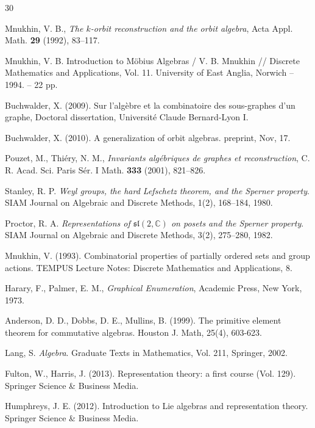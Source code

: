 \documentclass[12pt,reqno]{amsart}
\begin{document}
\begin{thebibliography}{30}

Mnukhin, V. B.,
\emph{The $k$-orbit reconstruction and the orbit algebra},
Acta Appl. Math. \textbf{29} (1992), 83--117.


Mnukhin, V. B. Introduction to M\"obius Algebras / V. B. Mnukhin //
Discrete Mathematics and Applications, Vol. 11. University of East
Anglia, Norwich – 1994. – 22 pp.

Buchwalder, X. (2009). Sur l'alg{\`e}bre et la combinatoire des sous-graphes d'un graphe, Doctoral dissertation, Universit{\'e} Claude Bernard-Lyon I.

Buchwalder, X. (2010). A generalization of orbit algebras. preprint, Nov, 17.

Pouzet, M., Thi\'ery, N. M.,
\emph{Invariants alg\'ebriques de graphes et reconstruction},
C. R. Acad. Sci. Paris S\'er. I Math. \textbf{333} (2001), 821--826.

Stanley, R. P.
\emph{Weyl groups, the hard Lefschetz theorem, and the Sperner property}.
SIAM Journal on Algebraic and Discrete Methods, 1(2), 168--184, 1980.

Proctor, R. A.
\emph{Representations of $\mathfrak{sl}(2,\mathbb C)$ on posets and the Sperner property}.
SIAM Journal on Algebraic and Discrete Methods, 3(2), 275--280, 1982.

Mnukhin, V. (1993). Combinatorial properties of partially ordered sets and group actions. TEMPUS Lecture Notes: Discrete Mathematics and Applications, 8.


Harary, F., Palmer, E. M.,
\emph{Graphical Enumeration},
Academic Press, New York, 1973.

Anderson, D. D., Dobbs, D. E.,  Mullins, B. (1999). The primitive element theorem for commutative algebras. Houston J. Math, 25(4), 603-623.

Lang, S.
\emph{Algebra}.
Graduate Texts in Mathematics, Vol. 211, Springer, 2002.

 Fulton, W.,  Harris, J. (2013). Representation theory: a first course (Vol. 129). Springer Science \& Business Media.

Humphreys, J. E. (2012). Introduction to Lie algebras and representation theory. Springer Science \& Business Media.



\end{thebibliography}
\end{document}
